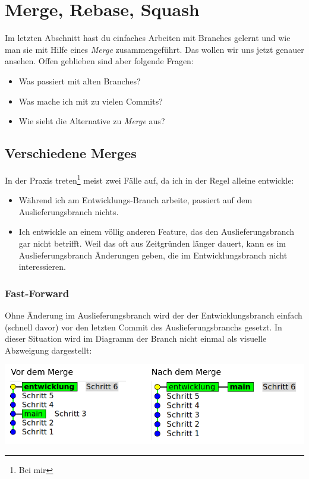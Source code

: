 \documentclass[
  letterpaper,
  DIV=11]{scrreprt}
\providecommand{\tightlist}{%
  \setlength{\itemsep}{0pt}\setlength{\parskip}{0pt}}\usepackage{longtable,booktabs,array}
\begin{document}

\chapter{Merge, Rebase, Squash}\label{merge-rebase-squash}

Im letzten Abschnitt hast du einfaches Arbeiten mit Branches gelernt und
wie man sie mit Hilfe eines \emph{Merge} zusammengeführt. Das wollen wir
uns jetzt genauer ansehen. Offen geblieben sind aber folgende Fragen:

\begin{itemize}
\tightlist
\item
  Was passiert mit alten Branches?
\item
  Was mache ich mit zu vielen Commits?
\item
  Wie sieht die Alternative zu \emph{Merge} aus?
\end{itemize}

\section{Verschiedene Merges}\label{verschiedene-merges}

In der Praxis treten\footnote{Bei mir} meist zwei Fälle auf, da ich in
der Regel alleine entwickle:

\begin{itemize}
\tightlist
\item
  Während ich am Entwicklungs-Branch arbeite, passiert auf dem
  Auslieferungsbranch nichts.
\item
  Ich entwickle an einem völlig anderen Feature, das den
  Auslieferungsbranch gar nicht betrifft. Weil das oft aus Zeitgründen
  länger dauert, kann es im Auslieferungsbranch Änderungen geben, die im
  Entwicklungsbranch nicht interessieren.
\end{itemize}

\subsection{Fast-Forward}\label{fast-forward}

Ohne Änderung im Auslieferungsbranch wird der der Entwicklungsbranch
einfach (schnell davor) vor den letzten Commit des Auslieferungsbranchs
gesetzt. In dieser Situation wird im Diagramm der Branch nicht einmal
als visuelle Abzweigung dargestellt:

\includegraphics[width=16cm,height=\textheight,keepaspectratio]{bilder/bash/fast_forward.png}
\end{document}
